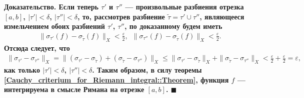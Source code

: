 \documentclass{report}
\newcounter{rem}[section]
\newenvironment{Proof}{\par\noindent\bf Доказательство.\rm}{ $\blacksquare$\par}
\begin{document}
\begin{Proof}
Если теперь $\tau'$ и $\tau''$ --- произвольные разбиения отрезка $[a,b]$, $|\tau'|<\delta$, $|\tau''|<\delta$, то, рассмотрев разбиение $\tilde\tau=\tau'\cup\tau''$, являющееся
измельчением обоих разбиений $\tau'$, $\tau''$, по доказанному будем иметь
\begin{gather*}
\|\sigma_{\tau'}(f)-\sigma_{\tilde{\tau}}(f)\|_X<\frac\varepsilon2,\,\,\,\|\sigma_{\tau''}(f)-\sigma_{\tilde{\tau}}(f)\|_X<\frac\varepsilon2.
\end{gather*}
Отсюда следует, что
\begin{gather*}
\|\sigma_{\tau'}-\sigma_{\tau''}\|_X=\|(\sigma_{\tau'}-\sigma_{\tilde{\tau}})+(\sigma_{\tilde{\tau}}-\sigma_{\tau''})\|_X\leqslant
\|\sigma_{\tau'}-\sigma_{\tilde{\tau}}\|_X+\|\sigma_{\tilde{\tau}}-\sigma_{\tau''}\|_X<\frac\varepsilon2+\frac\varepsilon2=\varepsilon,
\end{gather*}
как только $|\tau'|<\delta$, $|\tau''|<\delta$. Таким образом, в силу теоремы \ref{Cauchy_criterium_for_Riemann_integral::Theorem}, функция $f$ --- интегрируема в смысле Римана на отрезке
$[a,b]$.
\end{Proof}
\end{document}
